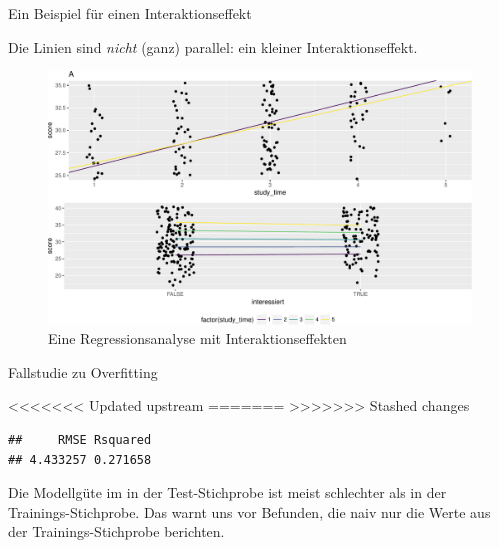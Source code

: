 \begin{frame}{Ein Beispiel für einen Interaktionseffekt}

Die Linien sind \emph{nicht} (ganz) parallel: ein kleiner
Interaktionseffekt.

\begin{figure}

{\centering \includegraphics[width=0.8\linewidth]{PraDa_Folien_nm_2_files/figure-beamer/interakt-stats-test-1} 

}

\caption{Eine Regressionsanalyse mit Interaktionseffekten}\label{fig:interakt-stats-test}
\end{figure}

\end{frame}

\begin{frame}[fragile]{Fallstudie zu Overfitting}

\begin{Shaded}
\begin{Highlighting}[]
<<<<<<< Updated upstream
\OperatorTok{::}\NormalTok{(}\OperatorTok{$}
=======
\NormalTok{(}  
>>>>>>> Stashed changes
\end{Highlighting}
\end{Shaded}

\begin{verbatim}
##     RMSE Rsquared 
## 4.433257 0.271658
\end{verbatim}

Die Modellgüte im in der Test-Stichprobe ist meist schlechter als in der
Trainings-Stichprobe. Das warnt uns vor Befunden, die naiv nur die Werte
aus der Trainings-Stichprobe berichten.

\end{frame}

